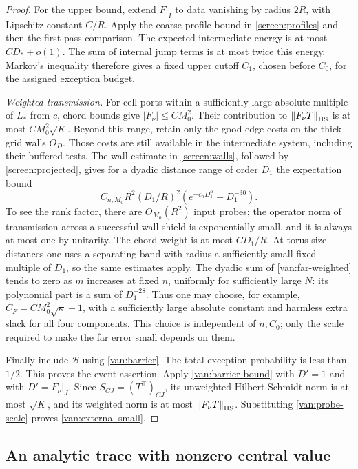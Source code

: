 \begin{proof}
For the upper bound, extend $F|_I$ to data vanishing by radius $2R$,
with Lipschitz constant $C/R$. Apply the coarse profile bound in
\cref{screen:profiles} and then the first-pass comparison. The
expected intermediate energy is at most $CD_*+o(1)$. The sum of
internal jump terms is at most twice this energy. Markov's inequality
therefore gives a fixed upper cutoff $C_1$, chosen before $C_0$, for
the assigned exception budget.

\emph{Weighted transmission.}
For cell ports within a sufficiently large absolute multiple of
$L_*$ from $c$, chord bounds give $|F_\nu|\leq CM_0^2$. Their
contribution to $\left\lVert F_\nu T\right\rVert_{\mathrm{HS}}$ is at most
$CM_0^2\sqrt K$. Beyond this range, retain only the good-edge costs
on the thick grid walls $O_D$. Those costs are still available in the
intermediate system, including their buffered tests. The wall estimate
in \cref{screen:walls}, followed by
\cref{screen:projected}, gives for a dyadic distance range of order
$D_1$ the expectation bound
\begin{equation}\label{van:far-weighted}
 C_{n,M_0}R^2(D_1/R)^2
 \left(e^{-c_nD_1^\alpha}+D_1^{-30}\right).
\end{equation}
To see the rank factor, there are $O_{M_0}(R^2)$ input probes; the
operator norm of transmission across a successful wall shield is
exponentially small, and it is always at most one by unitarity. The
chord weight is at most $CD_1/R$. At torus-size distances one uses a
separating band with radius a sufficiently small fixed multiple of
$D_1$, so the same estimates apply. The dyadic sum of
\cref{van:far-weighted} tends to zero as $m$ increases at fixed $n$,
uniformly for sufficiently large $N$: its polynomial part is a sum
of $D_1^{-28}$. Thus one may choose, for example,
$C_F=CM_0^2\sqrt\kappa+1$, with a sufficiently large absolute
constant and harmless extra slack for all four components. This
choice is independent of $n,C_0$; only the scale required to make the
far error small depends on them.

Finally include $\mathcal B$ using \cref{van:barrier}. The total
exception probability is less than $1/2$. This proves the event
assertion. Apply \cref{van:barrier-bound} with $D'=1$ and with
$D'=F_\nu|_J$. Since $S_{CJ}=(T^\top)_{CJ}$,
its unweighted Hilbert-Schmidt norm is at most $\sqrt K$, and its
weighted norm is at most $\left\lVert F_\nu T\right\rVert_{\mathrm{HS}}$.
Substituting \cref{van:probe-scale} proves
\cref{van:external-small}.
\end{proof}

\subsection{An analytic trace with nonzero central value}

